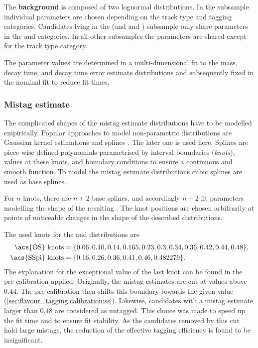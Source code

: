 The \textbf{background} \PDF is composed of two lognormal distributions. In the
\catLL subsample individual parameters are chosen depending on the track type
and tagging categories. Candidates lying in the (\catDD and \catOS and \catAU)
subsample only share parameters in the \catOO and \catOT categories. In all
other subsamples the parameters are shared except for the track type category.

The parameter values are determined in a multi-dimensional fit to the mass,
decay time, and decay time error estimate distributions and subsequently fixed
in the nominal fit to reduce fit times.

\subsubsection{Mistag estimate}
\label{sec:measurement_of_sin2beta:likelihood_fit:model:mistag}

The complicated shapes of the mistag estimate distributions have to be modelled
empirically. Popular approaches to model non-parametric distributions are \eg
Gaussian kernel estimations and splines \cite{Karbach:2014qba}. The later one is
used here. Splines are piece-wise defined polynomials parametrised by interval
boundaries (\emph{knots}), values at these knots, and boundary conditions to
ensure a continuous and smooth function. To model the mistag estimate
distributions cubic splines are used as base splines.

For $n$ knots, there are $n+2$ base splines, and accordingly $n+2$ fit
parameters modelling the shape of the resulting \PDF. The knot positions are
chosen arbitrarily at points of noticeable changes in the shape of the described
distributions.

The used knots for the \obsEtaOS and \obsEtaSS distributions are
%
\begin{equation*}
\begin{split}
  \text{\acs{OS} knots} &= \{0.06, 0.10, 0.14, 0.165, 0.23, 0.3, 0.34, 0.36, 0.42, 0.44, 0.48\} , \\
  \text{\acs{SSpi} knots} &= \{0.16, 0.26, 0.36, 0.41, 0.46, 0.482279\} .
\end{split}
\end{equation*}
%
The explanation for the exceptional value of the last \SSpi knot can be found in
the pre-calibration applied. Originally, the \SSpi mistag estimates are cut at
values above $\num{0.44}$. The pre-calibration then shifts this boundary towards
the given value (\cref{sec:flavour_tagging:calibration:ss}). Likewise,
\OS candidates with a mistag estimate larger than $\num{0.48}$ are considered as
\OS untagged. This choice was made to speed up the fit time and to ensure fit
stability. As the candidates removed by this cut hold large mistags, the
reduction of the effective tagging efficiency is found to be insignificant.

